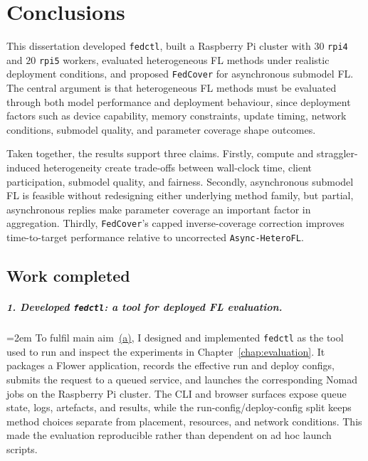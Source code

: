 \chapter{Conclusions}
\label{chap:conclusions}

This dissertation developed \texttt{fedctl}, built a Raspberry Pi cluster with \(30\) \texttt{rpi4} and \(20\) \texttt{rpi5} workers, evaluated heterogeneous FL methods under realistic deployment conditions, and proposed \texttt{FedCover} for asynchronous submodel FL. The central argument is that heterogeneous FL methods must be evaluated through both model performance and deployment behaviour, since deployment factors such as device capability, memory constraints, update timing, network conditions, submodel quality, and parameter coverage shape outcomes.

Taken together, the results support three claims. Firstly, compute and straggler-induced heterogeneity create trade-offs between wall-clock time, client participation, submodel quality, and fairness. Secondly, asynchronous submodel FL is feasible without redesigning either underlying method family, but partial, asynchronous replies make parameter coverage an important factor in aggregation. Thirdly, \texttt{FedCover}'s capped inverse-coverage correction improves time-to-target performance relative to uncorrected \texttt{Async-HeteroFL}.

\section{Work completed}

\paragraph{1. Developed \texttt{fedctl}: a tool for deployed FL evaluation.} \hangindent=2em
To fulfil main aim~\hyperref[aim:a]{(a)}, I designed and implemented \texttt{fedctl} as the tool used to run and inspect the experiments in Chapter~\ref{chap:evaluation}. It packages a Flower application, records the effective run and deploy configs, submits the request to a queued service, and launches the corresponding Nomad jobs on the Raspberry Pi cluster. The CLI and browser surfaces expose queue state, logs, artefacts, and results, while the run-config/deploy-config split keeps method choices separate from placement, resources, and network conditions. This made the evaluation reproducible rather than dependent on ad hoc launch scripts.

